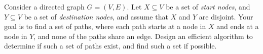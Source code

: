 \problem{}
Consider a directed graph $G = (V,E)$.  Let $X \subseteq V$ be a set of \emph{start nodes}, and $Y \subseteq V$ be a set of \emph{destination nodes}, and assume that $X$ and $Y$ are disjoint.  Your goal is to find a set of paths, where each path starts at a node in $X$ and ends at a node in $Y$, and none of the paths share an edge.  Design an efficient algorithm to determine if such a set of paths exist, and find such a set if possible.  


\solution{}
\newpage